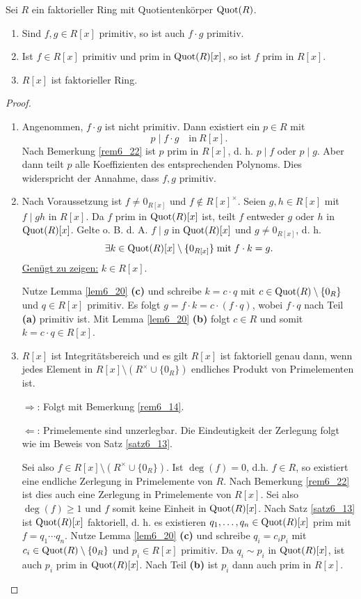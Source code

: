 \begin{thm}\label{thm6_23}
	Sei $R$ ein faktorieller Ring mit Quotientenkörper $\mathrm{Quot}(R)$.
	\begin{enumerate}[label=(\alph*)]
		\item Sind $f,g \in R[x]$ primitiv, so ist auch $f \cdot g$ primitiv.
		\item Ist $f \in R[x]$ primitiv und prim in $\mathrm{Quot}(R)[x]$, so ist $f$ prim in $R[x]$. 
		\item $R[x]$ ist faktorieller Ring.
	\end{enumerate}
\end{thm}
\begin{proof}
	\begin{enumerate}[label=(\alph*)]
		\item Angenommen, $f \cdot g$ ist nicht primitiv. Dann existiert ein $p \in R$ mit 
		\[p \mid f \cdot g\quad \text{in}~ R[x].\]
		Nach Bemerkung \ref{rem6_22} ist $p$ prim in $R[x]$, d. h. $p\mid f$ oder $p \mid g$. Aber dann teilt $p$ alle Koeffizienten des entsprechenden Polynoms. Dies widerspricht der Annahme, dass $f, g$ primitiv.
		\item Nach Voraussetzung ist $f \neq 0_{R[x]}$ und $f \notin R[x]^\times$. Seien $g, h \in R[x]$ mit $f \mid gh$ in $R[x]$. Da $f$ prim in $\mathrm{Quot}(R)[x]$ ist, teilt $f$ entweder $g$ oder $h$ in $\mathrm{Quot}(R)[x]$. Gelte o. B. d. A. $f \mid g$ in $\mathrm{Quot}(R)[x]$ und $g \neq 0_{R[x]}$, d. h.
		\[\exists k \in \mathrm{Quot}(R)[x] \setminus \{0_{R[x]}\} \;\text{mit}\; f \cdot k = g.\]
		\underline{Genügt zu zeigen:} $k \in R[x]$.
		
		Nutze Lemma \ref{lem6_20} \textbf{(c)} und schreibe $k = c\cdot q$ mit $c \in \mathrm{Quot}(R) \setminus \{0_{R}\}$ und $q \in R[x]$ primitiv. Es folgt $g = f  \cdot k = c \cdot (f \cdot q)$, wobei $f \cdot q$ nach Teil \textbf{(a)} primitiv ist. Mit Lemma \ref{lem6_20} \textbf{(b)} folgt $c \in R$ und somit $k = c\cdot q \in R[x]$.
		
		\item $R[x]$ ist Integritätsbereich und es gilt $R[x]$ ist faktoriell genau dann, wenn jedes Element in $R[x] \setminus (R^\times \cup \{0_R\})$ endliches Produkt von Primelementen ist.
		
		\glqq$\Rightarrow$\grqq: Folgt mit Bemerkung \ref{rem6_14}.
		
		\glqq$\Leftarrow$\grqq: Primelemente sind unzerlegbar. Die Eindeutigkeit der Zerlegung folgt wie im Beweis von Satz \ref{satz6_13}.
		
		
		Sei also $f \in R[x] \setminus (R^\times \cup \{0_R\})$. Ist $\deg(f) = 0$, d.h. $f \in R$, so existiert eine endliche Zerlegung in Primelemente von $R$. Nach Bemerkung \ref{rem6_22} ist dies auch eine Zerlegung in Primelemente von $R[x]$. Sei also $\deg(f) \geq 1$ und $f$ somit keine Einheit in $\mathrm{Quot}(R)[x]$. Nach Satz \ref{satz6_13} ist $\mathrm{Quot}(R)[x]$ faktoriell, d. h. es existieren $q_1, \dots, q_n \in \mathrm{Quot}(R)[x]$ prim mit $f = q_1 \cdots q_n$. Nutze Lemma \ref{lem6_20} \textbf{(c)} und schreibe $q_i = c_i p_i$ mit $c_i \in \mathrm{Quot}(R) \setminus \{0_R\}$ und $p_i \in R[x]$ primitiv. Da $q_i \sim p_i$ in $\mathrm{Quot}(R)[x]$, ist auch $p_i$ prim in $\mathrm{Quot}(R)[x]$. Nach Teil \textbf{(b)} ist $p_i$ dann auch prim in $R[x]$.
		

\end{enumerate}
\end{proof}

